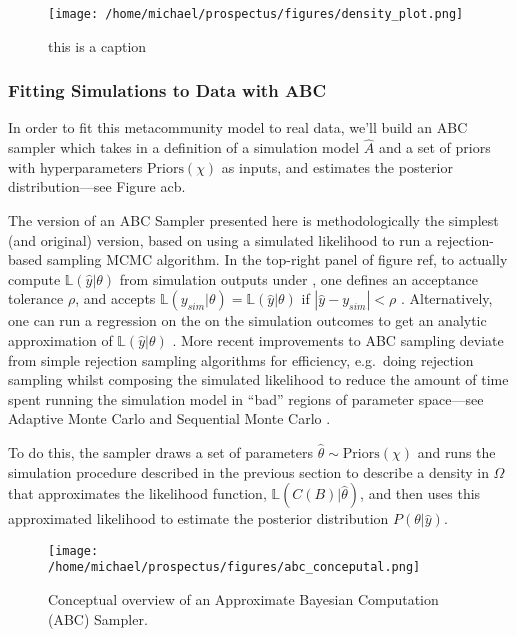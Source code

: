 \documentclass[]{article}
\begin{document}
\begin{figure}[H]
\centering
\texttt{[image: /home/michael/prospectus/figures/density\_plot.png]}
\caption{this is a caption}
\end{figure}

\hypertarget{fitting-to-data-with-abc}{%
\subsubsection{Fitting Simulations to Data with
ABC}\label{fitting-to-data-with-abc}}

In order to fit this metacommunity model to real data, we'll build an ABC sampler which takes in a definition of a simulation model $\hat{A}$
and a set of priors with hyperparameters
$\text{Priors}(\chi)$ as inputs, and estimates the posterior distribution---see Figure acb.

The version of an ABC Sampler presented here is methodologically the
simplest (and original) version, based on using a simulated likelihood
to run a rejection-based sampling MCMC algorithm. In the
top-right panel of figure ref, to actually compute \(\mathbb{L}(\hat{y} | \theta)\) from
simulation outputs under \cite{beaumont_adaptive_2003}, one defines an acceptance tolerance
\(\rho\), and accepts $\mathbb{L}(y_{sim} | \theta) = \mathbb{L}(\hat{y} | \theta)$ if \(|\hat{y} - y_{sim}| < \rho\) . Alternatively, one
can run a regression on the on the simulation outcomes to get an
analytic approximation of \(\mathbb{L}(\hat{y} | \theta)\) \cite{whodidthis}. More recent
improvements to ABC sampling deviate from simple rejection sampling
algorithms for efficiency, e.g.~doing rejection sampling whilst
composing the simulated likelihood to reduce the amount of time spent
running the simulation model in ``bad'' regions of parameter space---see
Adaptive Monte Carlo \citep{beaumont_adaptive_2009} and Sequential
Monte Carlo \citep{cite}.

To do this, the sampler draws a set of parameters
 $\hat{\theta} \sim \text{Priors}(\chi)$
and runs the simulation procedure described in the previous section to describe a density in
$\Omega$ that approximates the likelihood function,
$\mathbb{L}(C(B) | \hat{\theta})$, and then uses this approximated likelihood to estimate the posterior distribution
$P(\theta | \hat{y})$.

\begin{figure}[H]
\centering
\texttt{[image: /home/michael/prospectus/figures/abc\_conceputal.png]}
\caption{Conceptual overview of an Approximate Bayesian Computation (ABC) Sampler.
}
\end{figure}
\end{document}
